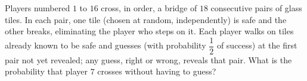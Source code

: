 Players numbered $1$ to $16$ cross, in order, a bridge of $18$ consecutive pairs of glass tiles. In each pair, one tile (chosen at random, independently) is safe and the other breaks, eliminating the player who steps on it. Each player walks on tiles already known to be safe and guesses (with probability $\dfrac12$ of success) at the first pair not yet revealed; any guess, right or wrong, reveals that pair. What is the probability that player $7$ crosses without having to guess?
